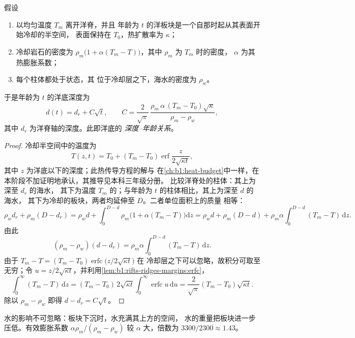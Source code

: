 \begin{theorem}[深度–年龄关系]\label{thm:b1:rifts-ridges-margins:depth-age}
假设
\begin{enumerate}
  \item {}以均匀温度 $T_m$ 离开洋脊，并且
        年龄为 $t$ 的洋板块是一个自那时起从其表面开始冷却的半空间，
        表面保持在 $T_0$，热扩散率为 $\kappa$；
  \item 冷却岩石的密度为 $\rho_m\bigl(1 + \alpha(T_m -
        T)\bigr)$，其中 $\rho_m$ 为 $T_m$ 时的密度，
        $\alpha$ 为其热膨胀系数；
  \item 每个柱体都处于状态，其
        位于冷却层之下，海水的密度为 $\rho_w$。
\end{enumerate}
于是年龄为 $t$ 的洋底深度为
\[
  d(t) = d_r + C\sqrt t, \qquad
  C = \frac{2}{\sqrt\pi}\,\frac{\rho_m\,\alpha\,(T_m - T_0)\sqrt\kappa}{\rho_m - \rho_w},
\]
其中 $d_r$ 为洋脊轴的深度。此即洋底的
\emph{深度–年龄关系}。
\end{theorem}

\begin{proof}
冷却半空间中的温度为
\[
  T(z, t) = T_0 + (T_m - T_0)\operatorname{erf}\frac{z}{2\sqrt{\kappa t}},
\]
其中 $z$ 为洋底以下的深度；此热传导方程的解与
在\cref{ch:b1:heat-budget}中一样，在本阶段不加证明地承认，其推导见本科三年级分册。
比较洋脊处的柱体：其上为深至 $d_r$ 的海水，
其下为温度 $T_m$ 的；与年龄为 $t$ 的柱体相比，其上为深至 $d$ 的海水，
其下为冷却的板块，两者均延伸至 $D$。二者单位面积上的质量
相等：
\[
  \rho_w d_r + \rho_m (D - d_r) = \rho_w d + \int_0^{D-d}\rho_m\bigl(1 + \alpha(T_m - T)\bigr)\mathrm dz
  = \rho_w d + \rho_m (D - d) + \rho_m\alpha\int_0^{D-d}(T_m - T)\,\mathrm dz.
\]
由此
\[
  (\rho_m - \rho_w)(d - d_r) = \rho_m\alpha\int_0^{D-d}(T_m - T)\,\mathrm dz.
\]
由于 $T_m - T = (T_m - T_0)\operatorname{erfc}\bigl(z/2\sqrt{\kappa t}\bigr)$ 在
冷却层之下可以忽略，故积分可取至无穷；令
$u = z/2\sqrt{\kappa t}$，并利用\cref{lem:b1:rifts-ridges-margins:erfc}，
\[
  \int_0^\infty (T_m - T)\,\mathrm dz = (T_m - T_0)\,2\sqrt{\kappa t}\int_0^\infty\operatorname{erfc}u\,\mathrm du
  = \frac{2}{\sqrt\pi}(T_m - T_0)\sqrt{\kappa t}.
\]
除以 $\rho_m - \rho_w$ 即得 $d - d_r = C\sqrt t$。
\end{proof}

水的影响不可忽略：板块下沉时，水充满其上方的空间，
水的重量把板块进一步压低。有效膨胀系数
$\alpha\rho_m/(\rho_m - \rho_w)$ 较 $\alpha$ 大，倍数为
$3300/2300 \approx 1.43$。

